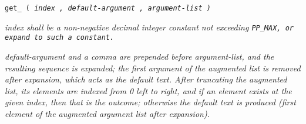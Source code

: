 
\tt{get_ (} \it{index} \tt{,} \it{default-argument} \tt{,} \it{argument-list} \tt{)}


\it{index} shall be a non-negative decimal integer constant
not exceeding \tt{PP_MAX}, or expand to such a constant.


\it{default-argument} and a comma are prepended before \it{argument-list},
and the resulting sequence is expanded; the first argument of the augmented
list is removed after expansion, which acts as the default text.
After truncating the augmented list, its elements are indexed from
0 left to right, and if an element exists at the given \it{index},
then that is the outcome; otherwise the default text is produced
(first element of the augmented argument list after expansion).

